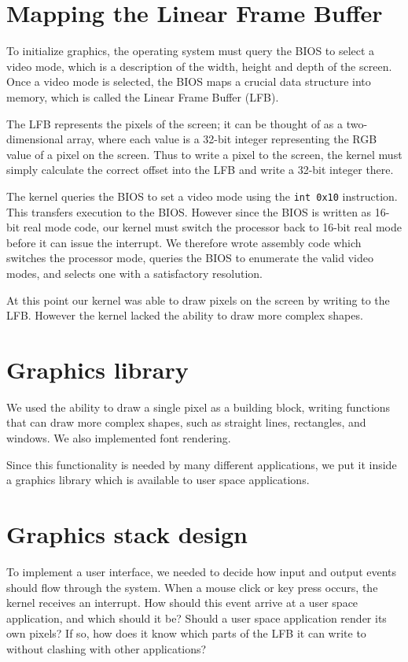 \documentclass{report}
\begin{document}
\section{Mapping the Linear Frame Buffer}
To initialize graphics, the operating system must query the BIOS to select a
video mode, which is a description of the width, height and depth of the
screen. Once a video mode is selected, the BIOS maps a crucial data structure
into memory, which is called the Linear Frame Buffer (LFB).

The LFB represents the pixels of the screen; it can be thought of as a
two-dimensional array, where each value is a 32-bit integer representing the
RGB value of a pixel on the screen. Thus to write a pixel to the screen, the
kernel must simply calculate the correct offset into the LFB and write a
32-bit integer there.

The kernel queries the BIOS to set a video mode using the
\texttt{int 0x10} instruction. This transfers execution to the BIOS. However
since the BIOS is written as 16-bit real mode code, our kernel must switch the
processor back to 16-bit real mode before it can issue the interrupt.
We therefore wrote assembly code which switches the processor mode,
queries the BIOS to enumerate the valid video modes, and selects one with a
satisfactory resolution.

At this point our kernel was able to draw pixels on the screen by writing to
the LFB. However the kernel lacked the ability to draw more complex shapes.


\section{Graphics library}
We used the ability to draw a single pixel as a building block, writing
functions that can draw more complex shapes, such as straight lines,
rectangles, and windows. We also implemented font rendering.

Since this functionality is needed by many different applications, we put it
inside a graphics library which is available to user space applications.


\section{Graphics stack design}
To implement a user interface, we needed to decide how input and output events
should flow through the system. When a mouse click or key press occurs, the
kernel receives an interrupt. How should this event arrive at a user space
application, and which should it be? Should a user space application render
its own pixels? If so, how does it know which parts of the LFB it can write to
without clashing with other applications? 
\end{document}
